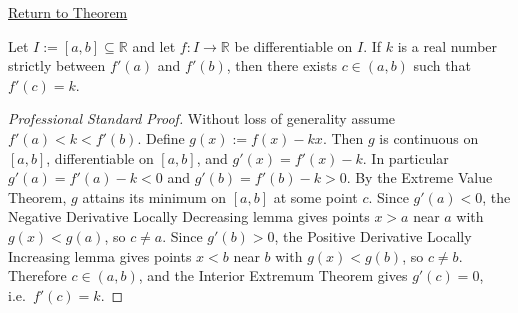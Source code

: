 \newpage
{}
\label{prf:darboux}

\begin{remark*}[Return]
\hyperref[thm:darboux]{Return to Theorem}
\end{remark*}

\begin{theorem*}
Let $I := [a,b] \subseteq \mathbb{R}$ and let $f : I \to \mathbb{R}$ be differentiable on $I$. If $k$ is a real number strictly between $f'(a)$ and $f'(b)$, then there exists $c \in (a,b)$ such that $f'(c) = k$.
\end{theorem*}

\begin{proof}[Professional Standard Proof]
\LRAProofBodyStart
Without loss of generality assume $f'(a) < k < f'(b)$. Define $g(x) := f(x) - kx$. Then $g$ is continuous on $[a,b]$, differentiable on $[a,b]$, and $g'(x) = f'(x) - k$. In particular $g'(a) = f'(a) - k < 0$ and $g'(b) = f'(b) - k > 0$. By the Extreme Value Theorem, $g$ attains its minimum on $[a,b]$ at some point $c$. Since $g'(a) < 0$, the Negative Derivative Locally Decreasing lemma gives points $x > a$ near $a$ with $g(x) < g(a)$, so $c \neq a$. Since $g'(b) > 0$, the Positive Derivative Locally Increasing lemma gives points $x < b$ near $b$ with $g(x) < g(b)$, so $c \neq b$. Therefore $c \in (a,b)$, and the Interior Extremum Theorem gives $g'(c) = 0$, i.e.\ $f'(c) = k$.
\end{proof}

